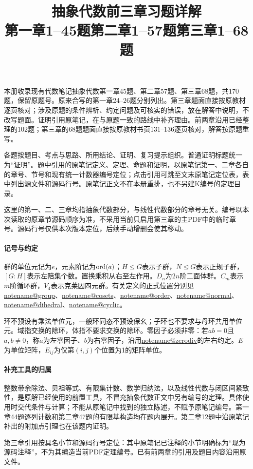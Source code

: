 \documentclass[UTF8,a4paper,11pt,fontset=windows]{ctexart}
\title{抽象代数前三章习题详解\\\large 第一章1--45题\quad 第二章1--57题\quad 第三章1--68题}
\author{}\date{}
\makeatletter
\newcommand{\noteref}[1]{\hyperref[note:#1]{\csname notename@#1\endcsname}}
\makeatother
\begin{document}
\maketitle
本册收录现有代数笔记抽象代数第一章45题、第二章57题、第三章68题，共170题，保留原题号。原来合写的第一章24--26题分别列出。第三章题面直接按原教材逐页核对；涉及原题的条件辨析、约定问题及可核实的错误，放在解答中说明，不改写题面。证明引用原笔记，在与原题一致的路线中补齐理由。前两章沿用已经整理的102题；第三章的68题题面直接按原教材书页131--136逐页核对，解答按原题重写。

各题按题目、考点与思路、所用结论、证明、复习提示组织。普通证明标题统一为“证明”。题中引用的原笔记定义、定理、命题和证明，以原笔记第一、二章各自的章号、节号和现有统一计数器编号定位；点击引用可跳至文末原笔记定位表，表中列出源文件和源码行号。原笔记正文不在本册重排，也不另建K编号的定理目录。

这里的第一、二、三章均指抽象代数部分，与线性代数部分的章号无关。编号以本次读取的原章节源码顺序为准，不采用当前只启用第三章的主PDF中的临时章号。源码行号仅供本次版本定位，后续手动增删会使其移动。

\paragraph{记号与约定}
群的单位元记为$e$，元素阶记为$\operatorname{ord}(a)$；$H\leq G$表示子群，$N\trianglelefteq G$表示正规子群，$[G:H]$表示左陪集个数。置换乘积从右至左作用。$D_n$为$2n$阶二面体群。$C_m$表示$m$阶循环群，$V_4$表示克莱因四元群。有关定义的正式位置分别见\noteref{group}、\noteref{cosets}、\noteref{order}、\noteref{normal}、\noteref{dihedral}、\noteref{cyclic}。

环不预设有乘法单位元，一般环同态不预设保幺；子环也不要求与母环共用单位元。域指交换的除环，体指不要求交换的除环。零因子必须非零：若$ab=0$且$a,b\ne0$，称$a$为左零因子、$b$为右零因子，沿用\noteref{zerodiv}的左右约定。$E$为单位矩阵，$E_{ij}$为仅第$(i,j)$个位置为1的矩阵单位。

\paragraph{补充工具的归属}
整数带余除法、贝祖等式、有限集计数、数学归纳法，以及线性代数与闭区间紧致性，是原解已经使用的前置工具，不冒充抽象代数正文中另有编号的定理。具体使用时交代条件与计算；不能从原笔记中找到的独立陈述，不赋予原笔记编号。第一章44题逐列计数和第二章47题的有限基构造均在题内展开。第二章12题中沿原笔记补出的附加点引理也在该题内证明。

第三章引用按具名小节和源码行号定位：其中原笔记已注释的小节明确标为“现为源码注释”，不为其编造当前PDF定理编号。已有前两章的引用及题目内容沿用原文件。
\end{document}
